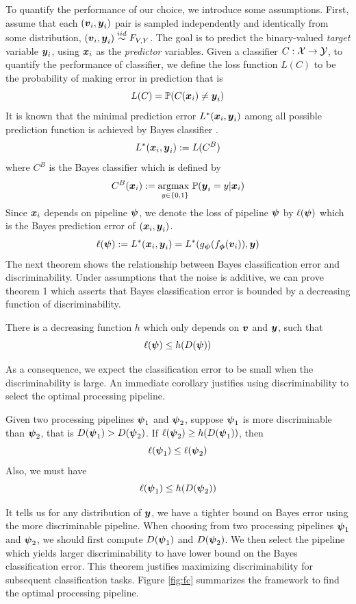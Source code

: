 \documentclass{article}
\begin{document}
To quantify the performance of our choice, we introduce some assumptions.  First, assume that each $(\boldsymbol{v}_i,\boldsymbol{y}_i)$ pair is sampled independently and identically from some distribution, $(\boldsymbol{v}_i,\boldsymbol{y}_i) \overset{iid}{\sim} F_{V,Y}$. The goal is to predict the binary-valued \emph{target} variable $\boldsymbol{y}_i$,  using $\boldsymbol{x}_i$ as the \emph{predictor} variables. Given a classifier $C: \mathcal{X} \rightarrow \mathcal{Y}$, to quantify the performance of classifier, we define the loss function $L(C)$ to be the probability of making error in prediction that is
\[L(C) = \mathbb{P}(C(\boldsymbol{x}_i) \neq \boldsymbol{y}_i) \]
It is known that the minimal prediction error $L^*(\boldsymbol{x}_i,\boldsymbol{y}_i)$ among all possible prediction function is achieved by Bayes classifier \cite{devroye2013probabilistic}.
\[L^*(\boldsymbol{x}_i,\boldsymbol{y}_i) : = L(C^B)\]
where $C^{B}$ is the Bayes classifier which is defined by
\[C^{B}(\boldsymbol{x}_i):= \underset{y \in \{0,1\} }{\text{argmax }} \mathbb{P}(\boldsymbol{y}_i=y|\boldsymbol{x}_i)\] 
Since $\boldsymbol{x}_i$ depends on pipeline $\boldsymbol{\psi}$, we denote the loss of pipeline $\boldsymbol{\psi}$ by $\ell(\boldsymbol{\psi})$ which is the Bayes prediction error of $(\boldsymbol{x}_i, \boldsymbol{y}_i)$.
\[\ell(\boldsymbol{\psi}):= L^*(\boldsymbol{x}_i,\boldsymbol{y}_i) = L^*(g_{\boldsymbol{\psi}} (f_{\boldsymbol{\phi}} (\boldsymbol{v}_i) ),\boldsymbol{y}) \] 
The next theorem shows the relationship between Bayes classification error and discriminability. Under assumptions that the noise is additive, we can prove theorem 1 which asserts that Bayes classification error is bounded by a decreasing function of discriminability. 
\begin{thm}	
	There is a decreasing function $h$ which only depends on $\boldsymbol{v}$ and $\boldsymbol{y}$, such that
	\[\ell(\boldsymbol{\psi}) \leq h(D(\boldsymbol{\psi})) \]
\end{thm}
As a consequence, we expect the classification error to be small when the discriminability is large. An immediate corollary justifies using discriminability to select the optimal processing pipeline. 
\begin{coro}	
	Given two processing pipelines $\boldsymbol{\psi}_1$ and $\boldsymbol{\psi}_2$, suppose $\boldsymbol{\psi}_1$ is more discriminable than $\boldsymbol{\psi}_2$, that is $D(\boldsymbol{\psi}_1) > D(\boldsymbol{\psi}_2)$. If $\ell(\boldsymbol{\psi}_2) \geq h(D(\boldsymbol{\psi}_1))$, then
	\[ \ell(\boldsymbol{\psi}_1) \leq \ell(\boldsymbol{\psi}_2) \] 
	Also, we must have
	\[ \ell(\boldsymbol{\psi}_1) \leq h(D(\boldsymbol{\psi}_2)) \]
	
\end{coro}
It tells us for any distribution of $\boldsymbol{y}$, we have a tighter bound on Bayes error using the more discriminable pipeline. When choosing from two processing pipelines $\boldsymbol{\psi}_1$ and $\boldsymbol{\psi}_2$, we should first compute $D(\boldsymbol{\psi}_1)$ and $D(\boldsymbol{\psi}_2)$. We then select the pipeline which yields larger discriminability to have lower bound on the Bayes classification error. This theorem justifies maximizing discriminability for subsequent classification tasks. Figure \ref{fig:fc} summarizes the framework to find the optimal processing pipeline. 
\end{document}
